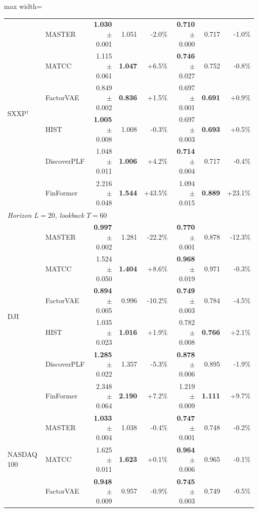 \begin{table}[tb]
\begin{adjustbox}{max width=\textwidth}
{\begin{tabular}{llrrrrrr}
\midrule
\multirow{6}{*}{SXXP$^\dagger$} & MASTER & \textbf{1.030} {\scriptsize$\pm$0.001} & 1.051 & -2.0\% & \textbf{0.710} {\scriptsize$\pm$0.000} & 0.717 & -1.0\% \\
 & MATCC & 1.115 {\scriptsize$\pm$0.061} & \textbf{1.047} & +6.5\% & \textbf{0.746} {\scriptsize$\pm$0.027} & 0.752 & -0.8\% \\
 & FactorVAE & 0.849 {\scriptsize$\pm$0.002} & \textbf{0.836} & +1.5\% & 0.697 {\scriptsize$\pm$0.001} & \textbf{0.691} & +0.9\% \\
 & HIST & \textbf{1.005} {\scriptsize$\pm$0.008} & 1.008 & -0.3\% & 0.697 {\scriptsize$\pm$0.003} & \textbf{0.693} & +0.5\% \\
 & DiscoverPLF & 1.048 {\scriptsize$\pm$0.011} & \textbf{1.006} & +4.2\% & \textbf{0.714} {\scriptsize$\pm$0.004} & 0.717 & -0.4\% \\
 & FinFormer & 2.216 {\scriptsize$\pm$0.048} & \textbf{1.544} & +43.5\% & 1.094 {\scriptsize$\pm$0.015} & \textbf{0.889} & +23.1\% \\
\midrule
\multicolumn{8}{l}{\textit{Horizon $L=20$, lookback $T=60$}} \\
\multirow{6}{*}{DJI} & MASTER & \textbf{0.997} {\scriptsize$\pm$0.002} & 1.281 & -22.2\% & \textbf{0.770} {\scriptsize$\pm$0.001} & 0.878 & -12.3\% \\
 & MATCC & 1.524 {\scriptsize$\pm$0.050} & \textbf{1.404} & +8.6\% & \textbf{0.968} {\scriptsize$\pm$0.019} & 0.971 & -0.3\% \\
 & FactorVAE & \textbf{0.894} {\scriptsize$\pm$0.005} & 0.996 & -10.2\% & \textbf{0.749} {\scriptsize$\pm$0.003} & 0.784 & -4.5\% \\
 & HIST & 1.035 {\scriptsize$\pm$0.023} & \textbf{1.016} & +1.9\% & 0.782 {\scriptsize$\pm$0.008} & \textbf{0.766} & +2.1\% \\
 & DiscoverPLF & \textbf{1.285} {\scriptsize$\pm$0.022} & 1.357 & -5.3\% & \textbf{0.878} {\scriptsize$\pm$0.006} & 0.895 & -1.9\% \\
 & FinFormer & 2.348 {\scriptsize$\pm$0.064} & \textbf{2.190} & +7.2\% & 1.219 {\scriptsize$\pm$0.009} & \textbf{1.111} & +9.7\% \\
\midrule
\multirow{6}{*}{NASDAQ 100} & MASTER & \textbf{1.033} {\scriptsize$\pm$0.004} & 1.038 & -0.4\% & \textbf{0.747} {\scriptsize$\pm$0.001} & 0.748 & -0.2\% \\
 & MATCC & 1.625 {\scriptsize$\pm$0.011} & \textbf{1.623} & +0.1\% & \textbf{0.964} {\scriptsize$\pm$0.006} & 0.965 & -0.1\% \\
 & FactorVAE & \textbf{0.948} {\scriptsize$\pm$0.009} & 0.957 & -0.9\% & \textbf{0.745} {\scriptsize$\pm$0.003} & 0.749 & -0.5\% \\

\end{tabular}}
\end{adjustbox}
\end{table}
